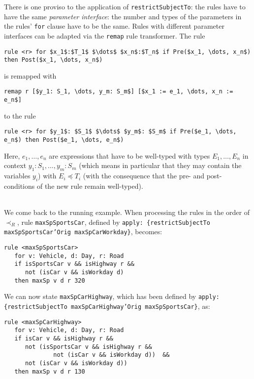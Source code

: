 There is one proviso to the application of \texttt{restrictSubjectTo}: the
rules have to have the same \emph{parameter interface}: the number and types
of the parameters in the rules' \texttt{for} clause have to be the same.
Rules with different parameter interfaces can be adapted via the
\texttt{remap} rule transformer. The rule 

\begin{lstlisting}[frame=none,mathescape=true]
rule <r> for $x_1$:$T_1$ $\dots$ $x_n$:$T_n$ if Pre($x_1, \dots, x_n$) then Post($x_1, \dots, x_n$)
\end{lstlisting}
is remapped with 
\begin{lstlisting}[frame=none,mathescape=true]
remap r [$y_1: S_1, \dots, y_m: S_m$] [$x_1 := e_1, \dots, x_n := e_n$]
\end{lstlisting}
to the rule
\begin{lstlisting}[frame=none,mathescape=true]
rule <r> for $y_1$: $S_1$ $\dots$ $y_m$: $S_m$ if Pre($e_1, \dots, e_n$) then Post($e_1, \dots, e_n$)
\end{lstlisting}
Here, $e_1, \dots, e_n$ are expressions that have to be well-typed with types $E_1, \dots, E_n$ in
context $y_1: S_1, \dots, y_m: S_m$ (which means in particular that they may
contain the variables $y_i$) with $E_i \preceq T_i$ (with the consequence that
the pre- and post-conditions of the new rule remain well-typed). 


\begin{example}\mbox{}\\
We come back to the running example. When processing the rules in the order of
$\prec_R$, rule \texttt{maxSpSportsCar}, defined by
\texttt{apply: \{restrictSubjectTo maxSpSportsCar'Orig maxSpCarWorkday\}},
becomes:
\begin{lstlisting}
rule <maxSpSportsCar>
   for v: Vehicle, d: Day, r: Road
   if isSportsCar v && isHighway r &&
      not (isCar v && isWorkday d)
   then maxSp v d r 320
 \end{lstlisting}

 We can now state \texttt{maxSpCarHighway}, which has been defined by
 \texttt{apply: \{restrictSubjectTo maxSpCarHighway'Orig maxSpSportsCar\}}, as:

 \begin{lstlisting}
rule <maxSpCarHighway>
   for v: Vehicle, d: Day, r: Road
   if isCar v && isHighway r &&
      not (isSportsCar v && isHighway r &&
              not (isCar v && isWorkday d))  &&
      not (isCar v && isWorkday d))
   then maxSp v d r 130
\end{lstlisting}
\end{example}

